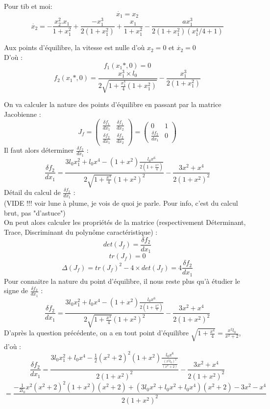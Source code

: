 \documentclass[10pt,a4paper]{article}
\begin{document}
Pour tib et moi:\\
\[ \dot{x_1}=x_2 \]
\[ \dot{x_2}=-\frac{x^2_2.x_1}{1+x^2_1} + \frac{-x^3_1}{2(1+x^2_1)} + \frac{x_1}{1+x^2_1} - \frac{ax^3_1}{2(1+x^2_1)(x^4_1/4 + 1)} \]



Aux points d'équilibre, la vitesse est nulle d'où $x_2=0$ et $\dot{x_2}=0$\\
D'où :\\
\[ f_1(x_1*,0) = 0 \]
\[ f_2(x_1*,0) = \frac{x_1^3\times l_0}{2\sqrt{1+\frac{x_1^4}{4}(1+x_1^2)}}-\frac{x_1^3}{2(1+x_1^2)} \]

On va calculer la nature des points d'équilibre en passant par la matrice Jacobienne :\\
\[
J_f=
\begin{pmatrix}
\frac{\delta f_1}{dx_1} & \frac{\delta f_1}{dx_2} \\
\frac{\delta f_2}{dx_1} & \frac{\delta f_2}{dx_2}
\end{pmatrix}
=
\begin{pmatrix}
0&1\\
\frac{\delta f_2}{dx_1}&0
\end{pmatrix}
\]
Il faut alors déterminer $\frac{\delta f_2}{dx_1}$ : \\
\[ \frac{\delta f_2}{dx_1} = \frac{3l_0x_1^2+l_0x^4 - (1+x^2)\frac{l_0x^6}{2(1+\frac{x^4}{4})}}{2\sqrt{1+\frac{x^4}{4}}(1+x^2)^2}-\frac{3x^2+x^4}{2(1+x^2)^2} \]
Détail du calcul de  $\frac{\delta f_2}{dx_1}$ :\\
(VIDE !!! voir lune à plume, je vois de quoi je parle. Pour info, c'est du calcul brut, pas "d'astuce")\\

On peut alors calculer les propriétés de la matrice (respectivement Déterminant, Trace, Discriminant du polynôme caractéristique) :\\
\[ det(J_f) =  \frac{\delta f_2}{dx_1} \]
\[ tr(J_f) = 0 \]
\[ \Delta(J_f) = tr(J_f)^2 - 4\times det(J_f) = 4\frac{\delta f_2}{dx_1}\]
Pour connaitre la nature du point d'équilibre, il nous reste plus qu'à étudier le signe de $\frac{\delta f_2}{dx_1}$ :\\
\[ \frac{\delta f_2}{dx_1} = \frac{3l_0x_1^2+l_0x^4 - (1+x^2)\frac{l_0x^6}{2(1+\frac{x^4}{4})}}{2\sqrt{1+\frac{x^4}{4}}(1+x^2)^2}-\frac{3x^2+x^4}{2(1+x^2)^2} \]
D'après la question précédente, on a en tout point d'équilibre $\sqrt{1+\frac{x^4}{4}}=\frac{x^2l_0}{x^2+2}$, d'où : \\
\[ \frac{\delta f_2}{dx_1} = \frac{3l_0x_1^2+l_0x^4 - \frac{1}{2}(x^2+2)^2(1+x^2)\frac{l_0x^6}{\frac{(x^2l_0)^2}{(x^2+2)}}}{2(1+x^2)^2}-\frac{3x^2+x^4}{2(1+x^2)^2} \]
\[ =\frac{-\frac{1}{2l_0}x^2(x^2+2)^2(1+x^2)(x^2+2)+(3l_0x^2+l_0x^2+l_0x^4)(x^2+2)-3x^2-x^4}{2(1+x^2)^2} \]
\end{document}
